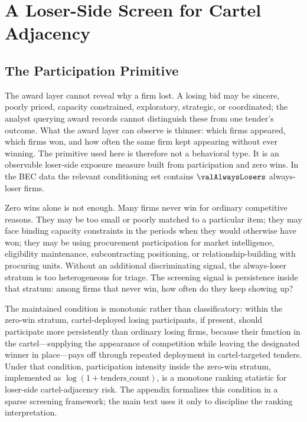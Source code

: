 \section{A Loser-Side Screen for Cartel Adjacency}
\label{sec:award_screen}

\subsection{The Participation Primitive}
\label{sec:award_primitive}

The award layer cannot reveal why a firm lost. A losing bid may
be sincere, poorly priced, capacity constrained, exploratory,
strategic, or coordinated; the analyst querying award records
cannot distinguish these from one tender's outcome. What the
award layer can observe is thinner: which firms appeared, which
firms won, and how often the same firm kept appearing without
ever winning. The primitive used here is therefore not a
behavioral type. It is an observable loser-side exposure measure
built from participation and zero wins. In the BEC data the
relevant conditioning set contains $\valAlwaysLosers$
always-loser firms.

Zero wins alone is not enough. Many firms never win for
ordinary competitive reasons. They may be too small or poorly
matched to a particular item; they may face binding capacity
constraints in the periods when they would otherwise have won;
they may be using procurement participation for market
intelligence, eligibility maintenance, subcontracting
positioning, or relationship-building with procuring units.
Without an additional discriminating signal, the always-loser
stratum is too heterogeneous for triage. The screening signal is
persistence inside that stratum: among firms that never win,
how often do they keep showing up?

The maintained condition is monotonic rather than
classificatory: within the zero-win stratum, cartel-deployed
losing participants, if present, should participate more
persistently than ordinary losing firms, because their function
in the cartel---supplying the appearance of competition while
leaving the designated winner in place---pays off through
repeated deployment in cartel-targeted tenders. Under that
condition, participation intensity inside the zero-win stratum,
implemented as $\log(1+\text{tenders\_count})$, is a monotone
ranking statistic for loser-side cartel-adjacency risk. The
appendix formalizes this condition in a sparse screening
framework; the main text uses it only to discipline the ranking
interpretation.

